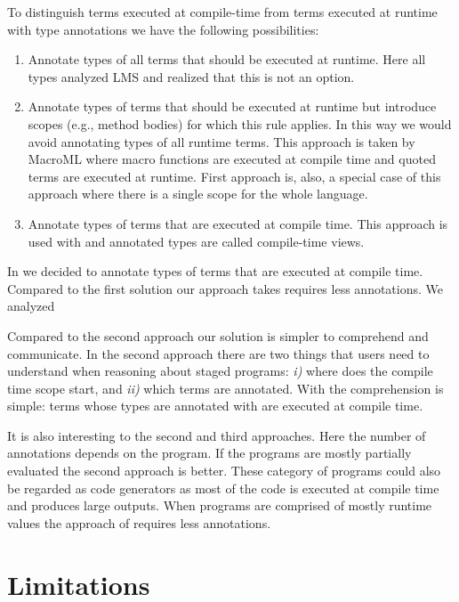 To distinguish terms executed at compile-time from terms executed at runtime with type annotations we have the following possibilities:
\begin{enumerate}
\item Annotate types of all terms that should be executed at runtime. Here all types analyzed LMS and realized that this is not an option.


\item Annotate types of terms that should be executed at runtime but introduce scopes (e.g., method bodies) for which this rule applies.
In this way we would avoid annotating types of all runtime terms. This approach is taken by MacroML where
macro functions are executed at compile time and quoted terms are executed at runtime. First approach is, also,
a special case of this approach where there is a single scope for the whole language.

\item Annotate types of terms that are executed at compile time. This approach is used with \tool and annotated types are
called compile-time views.
\end{enumerate}

In \tool we decided to annotate types of terms that are executed at compile time. Compared to
the first solution our approach takes requires less annotations. We analyzed

Compared to the second approach our solution is simpler to comprehend and communicate. In the second approach there are
two things that users need to understand when reasoning about staged programs: \emph{i)} where does
the compile time scope start, and \emph{ii)} which terms are annotated. With \tool the comprehension
is simple: terms whose types are annotated with  are executed at compile time.

It is also interesting to the second and third approaches. Here the number of annotations
depends on the program. If the programs are mostly partially evaluated the second approach
is better. These category of programs could also be regarded as code generators as most of the code
is executed at compile time and produces large outputs. When programs are comprised of mostly
runtime values the approach of \tool requires less annotations.

\section{Limitations}
\label{sct:limitations}

